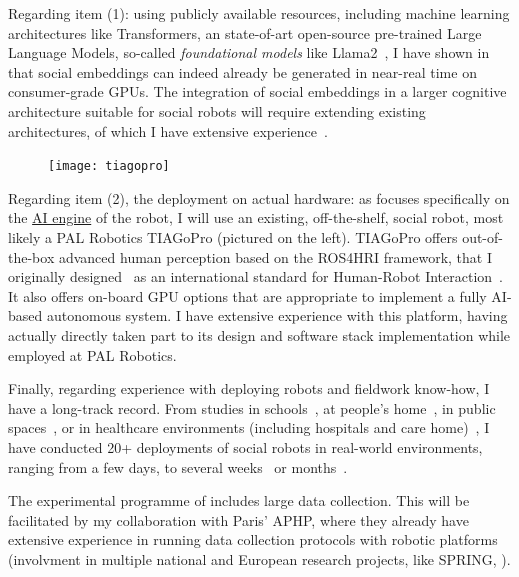 Regarding item (1): using publicly available resources, including machine learning architectures
like Transformers, an state-of-art open-source pre-trained Large Language
Models, so-called \emph{foundational models} like
Llama2~\cite{touvron2023llama}, I have shown in~\cite{lemaignan2024social} that
social embeddings can indeed already be generated in near-real time on consumer-grade
GPUs. The integration of social embeddings in a larger cognitive architecture
suitable for social robots will require extending existing architectures, of
which I have extensive experience~\cite{lemaignan2017artificial,
lemaignan2015pyrobots,baxter2016cognitive,lemaignan2014challenges,lemaignan2011what}.

\begin{figure}
    \centering
    \vspace{-10pt}
    \texttt{[image: tiagopro]}
    \label{fig|tiagopro}
\end{figure}

Regarding item (2), the deployment on actual hardware: as \project focuses specifically on the
\ul{AI engine} of the robot, I will use an existing, off-the-shelf, social
robot, most likely a PAL Robotics TIAGoPro (pictured on the left). TIAGoPro offers
out-of-the-box advanced human perception based on the ROS4HRI framework, that I
originally designed~\autocite{mohamed2021ros4hri} as an international standard for
Human-Robot Interaction~\autocite{lemaignan2022ros}. It also offers on-board GPU
options that are appropriate to implement a fully AI-based autonomous system.
I have extensive experience with this platform, having actually directly taken part to
its design and software stack implementation while employed at PAL Robotics.

Finally, regarding experience with deploying robots and fieldwork know-how, I
have a long-track record. From studies in
schools~\autocite{hood2015when, lemaignan2016learning, jacq2016building,
baxter2015wider,kennedy2016cautious,senft2018robots,lemaignan2022social},
at people's home~\autocite{mondada2015ranger}, in public
spaces~\autocite{alhafnawi2022deliberative}, or in healthcare environments
(including hospitals and care home)~\autocite{winkle2020couch,cooper2023challenges}, I have conducted 20+
deployments of social robots in real-world environments, ranging from a few
days, to several weeks~\autocite{jacq2016building,lemaignan2022social} or
months~\autocite{winkle2020couch}.

The experimental programme of \project includes large data collection. This will
be facilitated by my collaboration with Paris' APHP, where they already have
extensive experience in running data collection protocols with robotic
platforms (involvment in multiple national and European research projects, like
SPRING, ).

